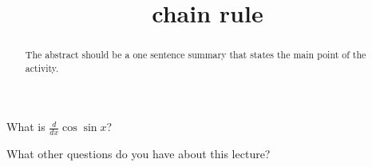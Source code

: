 \documentclass{ximera}
\title{chain rule}
\begin{document}
\begin{abstract}
  The abstract should be a one sentence summary that states the main point of the activity.
\end{abstract}

\maketitle

\begin{question}
  What is $\frac{d}{dx} \cos \sin x$?

  
    \begin{multipleChoice}
    \end{multipleChoice}  
  
\end{question}

What other questions do you have about this lecture?
\begin{question}
  \begin{freeResponse}
  \end{freeRepsonse}
\end{question}
\end{document}
